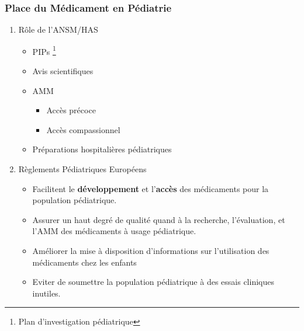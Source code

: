 \documentclass[11pt]{article}
\begin{document}
\subsubsection{Place du Médicament en Pédiatrie}
\label{sec:orge90a564}
\begin{enumerate}
\item Rôle de l'ANSM/HAS
\label{sec:orgf1256ba}
\begin{itemize}
\item PIPs \footnote{Plan d'investigation pédiatrique}
\item Avis scientifiques
\item AMM
\begin{itemize}
\item Accès précoce
\item Accès compassionnel
\end{itemize}
\item Préparations hospitalières pédiatriques
\end{itemize}
\item Règlements Pédiatriques Européens
\label{sec:org72bc998}
\begin{itemize}
\item Facilitent le \textbf{développement} et l'\textbf{accès} des médicaments pour la population pédiatrique.
\item Assurer un haut degré de qualité quand à la recherche, l'évaluation, et l'AMM des médicaments à usage pédiatrique.
\item Améliorer la mise à disposition d'informations sur l'utilisation des médicaments chez les enfants
\item Eviter de soumettre la population pédiatrique à des essais cliniques inutiles.
\end{itemize}
\end{enumerate}
\end{document}
